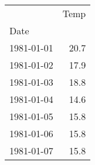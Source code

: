 \begin{tabular}{lr}
\toprule
{} &  Temp \\
Date       &       \\
\midrule
1981-01-01 &  20.7 \\
1981-01-02 &  17.9 \\
1981-01-03 &  18.8 \\
1981-01-04 &  14.6 \\
1981-01-05 &  15.8 \\
1981-01-06 &  15.8 \\
1981-01-07 &  15.8 \\
\bottomrule
\end{tabular}
